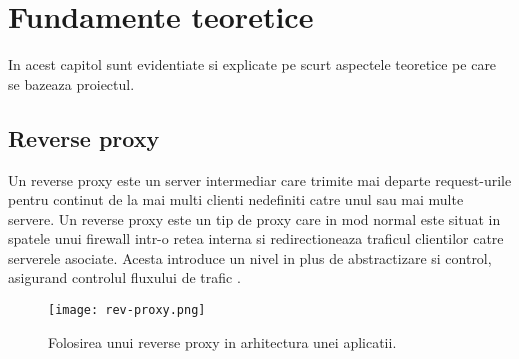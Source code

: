 \chapter{Fundamente teoretice}
\label{cap:fund-teoretice}


In acest capitol sunt evidentiate si explicate pe scurt aspectele teoretice pe care se bazeaza proiectul.

%
%
%
%
\section{Reverse proxy}

Un reverse proxy este un server intermediar care trimite mai departe request-urile pentru continut de la mai multi clienti nedefiniti catre unul sau mai multe servere. Un reverse proxy este un tip de proxy care in mod normal este situat in spatele unui firewall intr-o retea interna si redirectioneaza traficul clientilor catre serverele asociate. Acesta introduce un nivel in plus de abstractizare si control, asigurand controlul fluxului de trafic \cite{rev_proxy_server}.

\begin{figure}[h]
	\centering
	\texttt{[image: rev-proxy.png]}
	\caption{Folosirea unui reverse proxy in arhitectura unei aplicatii.}
	\label{fig:rev-proxy}
\end{figure}

